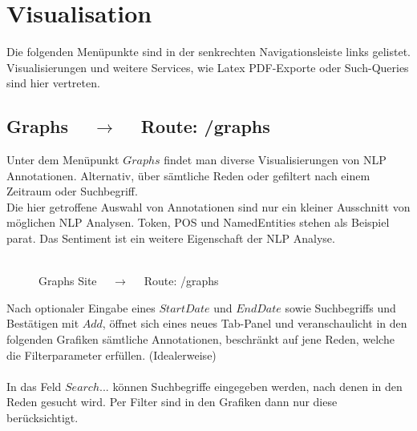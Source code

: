 \documentclass[10pt]{report}
\begin{document}
\chapter{Visualisation}

Die folgenden Menüpunkte sind in der senkrechten Navigationsleiste links
gelistet. Visualisierungen und weitere Services, wie Latex PDF-Exporte oder Such-Queries sind hier vertreten.  

\section{Graphs $\quad\rightarrow\quad$  Route:  /graphs}
      
Unter dem Menüpunkt $Graphs$ findet man diverse Visualisierungen von NLP Annotationen. Alternativ, über sämtliche Reden oder gefiltert nach einem Zeitraum oder Suchbegriff.   \\
\noindent Die hier getroffene Auswahl von Annotationen sind nur ein kleiner Ausschnitt von möglichen NLP Analysen. Token, POS und NamedEntities stehen als Beispiel parat. Das Sentiment ist ein weitere Eigenschaft der NLP Analyse.  \\\\

     
\begin{figure}[H]
	\begin{center}		
  	 \end{center}
	\caption{Graphs Site $\quad\rightarrow\quad$  Route:  /graphs}	
\end{figure}

\noindent Nach optionaler Eingabe eines $Start Date$ und $End Date$ sowie Suchbegriffs und Bestätigen mit $Add$, öffnet sich eines neues Tab-Panel 
und veranschaulicht in den folgenden Grafiken sämtliche Annotationen, beschränkt auf jene Reden, welche die Filterparameter erfüllen. (Idealerweise)\\\\
In das Feld $Search...$ können Suchbegriffe eingegeben werden, nach denen in den Reden gesucht wird. Per Filter sind in den Grafiken dann nur diese berücksichtigt. \\\\\\
\end{document}
